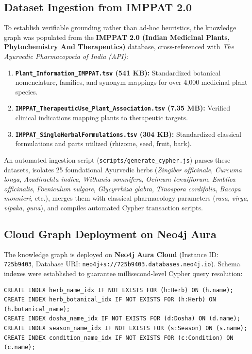 \subsection{Dataset Ingestion from IMPPAT 2.0}
To establish verifiable grounding rather than ad-hoc heuristics, the knowledge graph was populated from the \textbf{IMPPAT 2.0 (Indian Medicinal Plants, Phytochemistry And Therapeutics)} database, cross-referenced with \textit{The Ayurvedic Pharmacopoeia of India (API)}:
\begin{enumerate}
    \item \textbf{\texttt{Plant\_Information\_IMPPAT.tsv} (541 KB):} Standardized botanical nomenclature, families, and synonym mappings for over 4,000 medicinal plant species.
    \item \textbf{\texttt{IMPPAT\_TherapeuticUse\_Plant\_Association.tsv} (7.35 MB):} Verified clinical indications mapping plants to therapeutic targets.
    \item \textbf{\texttt{IMPPAT\_SingleHerbalFormulations.tsv} (304 KB):} Standardized classical formulations and parts utilized (rhizome, seed, fruit, bark).
\end{enumerate}

An automated ingestion script (\texttt{scripts/generate\_cypher.js}) parses these datasets, isolates 25 foundational Ayurvedic herbs (\textit{Zingiber officinale}, \textit{Curcuma longa}, \textit{Azadirachta indica}, \textit{Withania somnifera}, \textit{Ocimum tenuiflorum}, \textit{Emblica officinalis}, \textit{Foeniculum vulgare}, \textit{Glycyrrhiza glabra}, \textit{Tinospora cordifolia}, \textit{Bacopa monnieri}, etc.), merges them with classical pharmacology parameters (\textit{rasa}, \textit{virya}, \textit{vipaka}, \textit{guna}), and compiles automated Cypher transaction scripts.

\subsection{Cloud Graph Deployment on Neo4j Aura}
The knowledge graph is deployed on \textbf{Neo4j Aura Cloud} (Instance ID: \texttt{725b9403}, Database URI: \texttt{neo4j+s://725b9403.databases.neo4j.io}). Schema indexes were established to guarantee millisecond-level Cypher query resolution:

\begin{verbatim}
CREATE INDEX herb_name_idx IF NOT EXISTS FOR (h:Herb) ON (h.name);
CREATE INDEX herb_botanical_idx IF NOT EXISTS FOR (h:Herb) ON (h.botanical_name);
CREATE INDEX dosha_name_idx IF NOT EXISTS FOR (d:Dosha) ON (d.name);
CREATE INDEX season_name_idx IF NOT EXISTS FOR (s:Season) ON (s.name);
CREATE INDEX condition_name_idx IF NOT EXISTS FOR (c:Condition) ON (c.name);
\end{verbatim}


